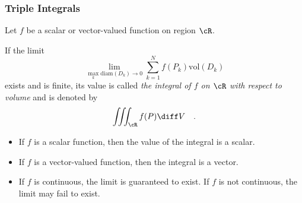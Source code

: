 \begin{frame}
\frametitle{Triple Integrals}
Let $f$ be a scalar or vector-valued function on region $\cR$.
\begin{definition}
If the limit
$$\lim_{\max_k\text{diam}(D_k) \to 0}  \sum_{k=1}^{N} f(P_k)\text{vol}(D_k)$$
exists and is finite, its value is called  \emph{the integral of $f$ on $\cR$ with respect to volume} and is denoted by
\[
\iiint_{\cR} f(P) \diff V\quad .
\]
\end{definition}
\begin{itemize}
\item<2-> If $f$ is a scalar function, then the value of the integral is a scalar.
\item<3-> If $f$ is a vector-valued function, then the integral is a vector.
\item<4-> If $f$ is continuous, the limit is guaranteed to exist. If $f$ is not continuous, the limit may fail to exist.
\end{itemize}
\end{frame}